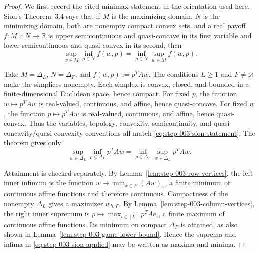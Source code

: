 \begin{proof}
We first record the cited minimax statement in the orientation used here.
Sion's Theorem~3.4 \citep{Sion1958} says that if \(M\) is the maximizing
domain, \(N\) is the minimizing domain, both are nonempty compact convex
sets, and a real payoff \(f:M\times N\to\mathbb R\) is upper semicontinuous
and quasi-concave in its first variable and lower semicontinuous and
quasi-convex in its second, then
\begin{equation}
\sup_{w\in M}\inf_{p\in N}f(w,p)
=\inf_{p\in N}\sup_{w\in M}f(w,p).
\label{eq:step-003-sion-statement}
\end{equation}

Take \(M=\Delta_L\), \(N=\Delta_F\), and
\(f(w,p):=p^{T}Aw\).  The conditions \(L\ge1\) and
\(F\ne\varnothing\) make the simplices nonempty.  Each simplex is convex,
closed, and bounded in a finite-dimensional Euclidean space, hence compact.
For fixed \(p\), the function \(w\mapsto p^{T}Aw\) is real-valued,
continuous, and affine, hence quasi-concave.  For fixed \(w\), the function
\(p\mapsto p^{T}Aw\) is real-valued, continuous, and affine, hence
quasi-convex.  Thus the variables, topology, convexity, semicontinuity, and
quasi-concavity/quasi-convexity conventions all match
\eqref{eq:step-003-sion-statement}.  The theorem gives only
\begin{equation}
\sup_{w\in\Delta_L}\inf_{p\in\Delta_F}p^{T}Aw
=\inf_{p\in\Delta_F}\sup_{w\in\Delta_L}p^{T}Aw.
\label{eq:step-003-sion-applied}
\end{equation}

Attainment is checked separately.  By
Lemma~\ref{lem:step-003-row-vertices}, the left inner infimum is the function
\(w\mapsto\min_{x\in F}(Aw)_x\), a finite minimum of continuous affine
functions and therefore continuous.  Compactness of the nonempty
\(\Delta_L\) gives a maximizer \(w_{h,F}\).  By
Lemma~\ref{lem:step-003-column-vertices}, the right inner supremum is
\(p\mapsto\max_{i\in[L]}p^{T}Ae_i\), a finite maximum of continuous affine
functions.  Its minimum on compact \(\Delta_F\) is attained, as also shown
in Lemma~\ref{lem:step-003-game-lower-bound}.  Hence the suprema and infima
in \eqref{eq:step-003-sion-applied} may be written as maxima and minima.


\end{proof}
